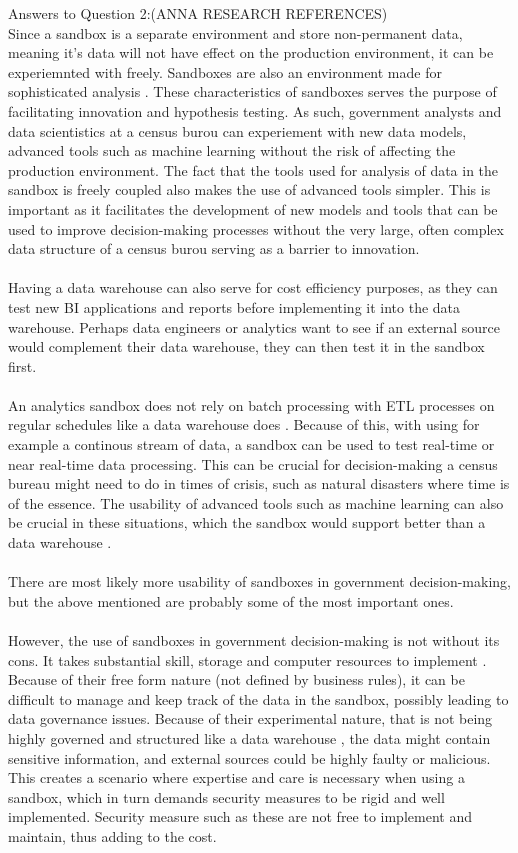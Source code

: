 \newpage Answers to Question 2:(ANNA RESEARCH REFERENCES)
\\Since a sandbox is a separate environment and store non-permanent data\cite{l2video}, meaning it's data will not have effect on 
the production environment, it can be experiemnted with freely. Sandboxes are also an environment made for sophisticated analysis \cite{l2video}.
These characteristics of sandboxes serves the purpose of facilitating innovation and hypothesis testing.
As such, government analysts and data scientistics at a census burou can experiement with new data models, advanced tools such as machine learning
without the risk of affecting the production environment. The fact that the tools used for analysis of data in the sandbox is freely coupled \cite{l2video} also makes the use of advanced tools simpler.
This is important as it facilitates the development of new models and tools that can be used to improve decision-making processes
without the very large, often complex data structure of a census burou serving as a barrier to innovation.
\\\\
Having a data warehouse can also serve for cost efficiency purposes, as they can test new BI applications and reports before implementing it into the data warehouse.
Perhaps data engineers or analytics want to see if an external source would complement their data warehouse, they can then test it in the sandbox first.
\\\\ 
An analytics sandbox does not rely on batch processing with ETL processes on regular schedules like a data warehouse does \cite{l2video}.
Because of this, with using for example a continous stream of data, 
a sandbox can be used to test real-time or near real-time data processing.
This can be crucial for decision-making a census bureau might need to do in times of crisis, 
such as natural disasters where time is of the essence. 
The usability of advanced tools such as machine learning can also be crucial in these situations, 
which the sandbox would support better than a data warehouse \cite{l2video}.
\\\\
There are most likely more usability of sandboxes in government decision-making,
but the above mentioned are probably some of the most important ones.
\\\\
However, the use of sandboxes in government decision-making is not without its cons. It takes substantial skill, storage and computer resources to implement \cite{l2video}.
Because of their free form nature (not defined by business rules), it can be difficult to manage and keep track of the data in the sandbox, possibly leading to data governance issues.
Because of their experimental nature, that is not being highly governed and structured like a data warehouse \cite{l2video}, the data might contain sensitive information, and external sources could be highly faulty or malicious.
This creates a scenario where expertise and care is necessary when using a sandbox, which in turn demands security measures to be rigid and well implemented. Security measure such as these are not free to implement and maintain, thus adding to the cost.
